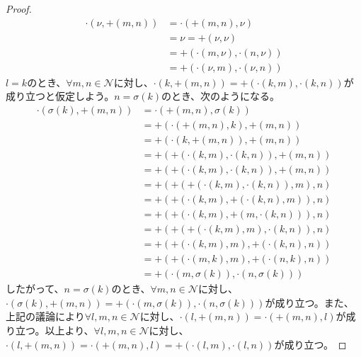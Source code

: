 \documentclass[dvipdfmx]{jsarticle}
\begin{document}
\begin{proof}
\begin{align*}
\cdot \left( \nu, + (m,n) \right) &= \cdot \left( + (m,n),\nu \right)\\
&= \nu = + (\nu,\nu)\\
&= + \left( \cdot (m,\nu), \cdot (n,\nu) \right)\\
&= + \left( \cdot (\nu,m), \cdot (\nu,n) \right)
\end{align*}
$l = k$のとき、$\forall m,n \in \mathcal{N}$に対し、$\cdot \left( k, + (m,n) \right) = + \left( \cdot (k,m), \cdot (k,n) \right)$が成り立つと仮定しよう。$n = \sigma(k)$のとき、次のようになる。
\begin{align*}
\cdot \left( \sigma(k), + (m,n) \right) &= \cdot \left( + (m,n),\sigma(k) \right)\\
&= + \left( \cdot \left( + (m,n),k \right), + (m,n) \right)\\
&= + \left( \cdot \left( k, + (m,n) \right), + (m,n) \right)\\
&= + \left( + \left( \cdot (k,m), \cdot (k,n) \right), + (m,n) \right)\\
&= + \left( + \left( \cdot (k,m), \cdot (k,n) \right), + (m,n) \right)\\
&= + \left( + \left( + \left( \cdot (k,m), \cdot (k,n) \right),m \right),n \right)\\
&= + \left( + \left( \cdot (k,m), + \left( \cdot (k,n),m \right) \right),n \right)\\
&= + \left( + \left( \cdot (k,m), + \left( m, \cdot (k,n) \right) \right),n \right)\\
&= + \left( + \left( + \left( \cdot (k,m),m \right), \cdot (k,n) \right),n \right)\\
&= + \left( + \left( \cdot (k,m),m \right), + \left( \cdot (k,n),n \right) \right)\\
&= + \left( + \left( \cdot (m,k),m \right), + \left( \cdot (n,k),n \right) \right)\\
&= + \left( \cdot \left( m,\sigma(k) \right), \cdot \left( n,\sigma(k) \right) \right)
\end{align*}
したがって、$n = \sigma(k)$のとき、$\forall m,n \in \mathcal{N}$に対し、$\cdot \left( \sigma(k), + (m,n) \right) = + \left( \cdot \left( m,\sigma(k) \right), \cdot \left( n,\sigma(k) \right) \right)$が成り立つ。また、上記の議論により$\forall l,m,n \in \mathcal{N}$に対し、$\cdot \left( l, + (m,n) \right) = \cdot \left( + (m,n),l \right)$が成り立つ。以上より、$\forall l,m,n \in \mathcal{N}$に対し、$\cdot \left( l, + (m,n) \right) = \cdot \left( + (m,n),l \right) = + \left( \cdot (l,m), \cdot (l,n) \right)$が成り立つ。\par

\end{proof}
\end{document}
